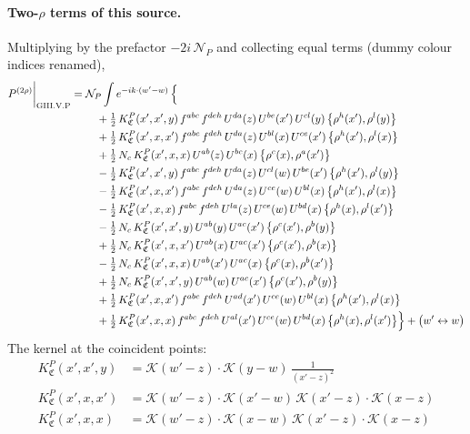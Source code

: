 \documentclass[10pt]{article}
\numberwithin{equation}{section}
\newcommand{\KK}{\mathcal K}
\newcommand{\NP}{\mathcal N_{P}}
\begin{document}
\paragraph{Two-$\rho$ terms of this source.} Multiplying by the prefactor $-2i\,\NP$ and collecting equal terms (dummy colour indices renamed),
\begin{align}
P^{(2\rho)}\bigg|_{\rm GIII.V.P}={}&\NP\int e^{-ik\cdot(w'-w)}\,\Big\{\notag\\
&\quad +\tfrac12\,K^{P}_{\mathfrak C}(x',x',y)\,f^{abc}\,f^{deh}\,U^{da}(z)\,U^{be}(x')\,U^{cl}(y)\,\big\{\rho^{h}(x'),\rho^{l}(y)\big\}\notag\\
&\quad +\tfrac12\,K^{P}_{\mathfrak C}(x',x,x')\,f^{abc}\,f^{deh}\,U^{da}(z)\,U^{bl}(x)\,U^{ce}(x')\,\big\{\rho^{h}(x'),\rho^{l}(x)\big\}\notag\\
&\quad +\tfrac12\,N_{c}\,K^{P}_{\mathfrak C}(x',x,x)\,U^{ab}(z)\,U^{bc}(x)\,\big\{\rho^{c}(x),\rho^{a}(x')\big\}\notag\\
&\quad -\tfrac12\,K^{P}_{\mathfrak C}(x',x',y)\,f^{abc}\,f^{deh}\,U^{da}(z)\,U^{cl}(w)\,U^{be}(x')\,\big\{\rho^{h}(x'),\rho^{l}(y)\big\}\notag\\
&\quad -\tfrac12\,K^{P}_{\mathfrak C}(x',x,x')\,f^{abc}\,f^{deh}\,U^{da}(z)\,U^{ce}(w)\,U^{bl}(x)\,\big\{\rho^{h}(x'),\rho^{l}(x)\big\}\notag\\
&\quad -\tfrac12\,K^{P}_{\mathfrak C}(x',x,x)\,f^{abc}\,f^{deh}\,U^{la}(z)\,U^{ce}(w)\,U^{bd}(x)\,\big\{\rho^{h}(x),\rho^{l}(x')\big\}\notag\\
&\quad -\tfrac12\,N_{c}\,K^{P}_{\mathfrak C}(x',x',y)\,U^{ab}(y)\,U^{ac}(x')\,\big\{\rho^{c}(x'),\rho^{b}(y)\big\}\notag\\
&\quad +\tfrac12\,N_{c}\,K^{P}_{\mathfrak C}(x',x,x')\,U^{ab}(x)\,U^{ac}(x')\,\big\{\rho^{c}(x'),\rho^{b}(x)\big\}\notag\\
&\quad -\tfrac12\,N_{c}\,K^{P}_{\mathfrak C}(x',x,x)\,U^{ab}(x')\,U^{ac}(x)\,\big\{\rho^{c}(x),\rho^{b}(x')\big\}\notag\\
&\quad +\tfrac12\,N_{c}\,K^{P}_{\mathfrak C}(x',x',y)\,U^{ab}(w)\,U^{ac}(x')\,\big\{\rho^{c}(x'),\rho^{b}(y)\big\}\notag\\
&\quad +\tfrac12\,K^{P}_{\mathfrak C}(x',x,x')\,f^{abc}\,f^{deh}\,U^{ad}(x')\,U^{ce}(w)\,U^{bl}(x)\,\big\{\rho^{h}(x'),\rho^{l}(x)\big\}\notag\\
&\quad +\tfrac12\,K^{P}_{\mathfrak C}(x',x,x)\,f^{abc}\,f^{deh}\,U^{al}(x')\,U^{ce}(w)\,U^{bd}(x)\,\big\{\rho^{h}(x),\rho^{l}(x')\big\}\Big\}+\big(w'\leftrightarrow w\big)\label{eq:res-GIII.V.P}
\end{align}
The kernel at the coincident points:
\begin{align*}
K^{P}_{\mathfrak C}(x',x',y)&=\KK(w'-z)\cdot\KK(y-w)\,\frac{1}{(x'-z)^2}\\K^{P}_{\mathfrak C}(x',x,x')&=\KK(w'-z)\cdot\KK(x'-w)\,\KK(x'-z)\cdot\KK(x-z)\\K^{P}_{\mathfrak C}(x',x,x)&=\KK(w'-z)\cdot\KK(x-w)\,\KK(x'-z)\cdot\KK(x-z)
\end{align*}
\end{document}
